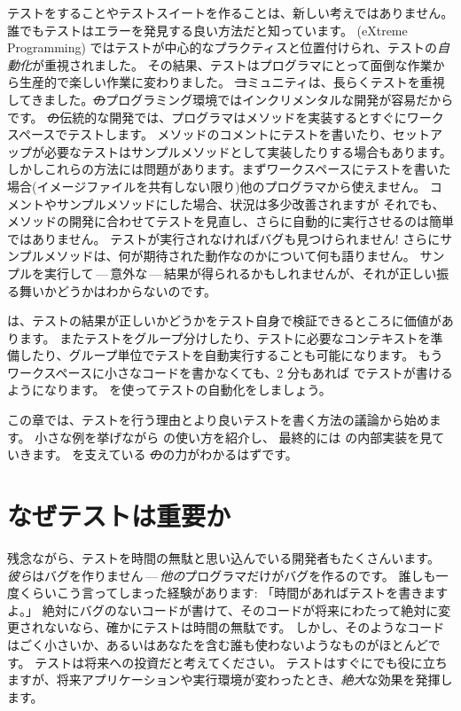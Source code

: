 \documentclass[a4paper,10pt,twoside]{book}
\begin{document}
テストをすることやテストスイートを作ることは、新しい考えではありません。
誰でもテストはエラーを発見する良い方法だと知っています。
\mbox{} (eXtreme Programming) ではテストが中心的なプラクティスと位置付けられ、テストの\emph{自動化}が重視されました。
その結果、テストはプログラマにとって面倒な作業から生産的で楽しい作業に変わりました。
\st コミュニティは、長らくテストを重視してきました。\st のプログラミング環境ではインクリメンタルな開発が容易だからです。
\st の伝統的な開発では、プログラマはメソッドを実装するとすぐにワークスペースでテストします。
メソッドのコメントにテストを書いたり、セットアップが必要なテストはサンプルメソッドとして実装したりする場合もあります。
しかしこれらの方法には問題があります。まずワークスペースにテストを書いた場合(イメージファイルを共有しない限り)他のプログラマから使えません。
コメントやサンプルメソッドにした場合、状況は多少改善されますが
それでも、メソッドの開発に合わせてテストを見直し、さらに自動的に実行させるのは簡単ではありません。
テストが実行されなければバグも見つけられません!
さらにサンプルメソッドは、何が期待された動作なのかについて何も語りません。
サンプルを実行して\,---\,意外な\,---\,結果が得られるかもしれませんが、それが正しい振る舞いかどうかはわからないのです。%

\sunit は、テストの結果が正しいかどうかをテスト自身で検証できるところに価値があります。
またテストをグループ分けしたり、テストに必要なコンテキストを準備したり、グループ単位でテストを自動実行することも可能になります。
もうワークスペースに小さなコードを書かなくても、2 分もあれば \sunit でテストが書けるようになります。
\sunit を使ってテストの自動化をしましょう。

この章では、テストを行う理由とより良いテストを書く方法の議論から始めます。
小さな例を挙げながら \sunit の使い方を紹介し、
最終的には \sunit の内部実装を見ていきます。
\sunit を支えている \st のの力がわかるはずです。

\section{なぜテストは重要か}

残念ながら、テストを時間の無駄と思い込んでいる開発者もたくさんいます。
\emph{彼ら}はバグを作りません\,---\,\emph{他の}プログラマだけがバグを作るのです。
誰しも一度くらいこう言ってしまった経験があります:
「時間があればテストを書きますよ。」
絶対にバグのないコードが書けて、そのコードが将来にわたって絶対に変更されないなら、確かにテストは時間の無駄です。
しかし、そのようなコードはごく小さいか、あるいはあなたを含む誰も使わないようなものがほとんどです。
テストは将来への投資だと考えてください。
テストはすぐにでも役に立ちますが、将来アプリケーションや実行環境が変わったとき、\emph{絶大}な効果を発揮します。
\end{document}

